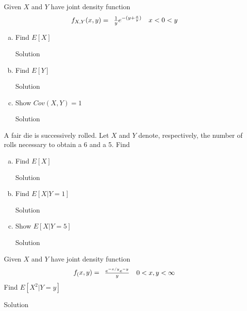 \documentclass{article}
\begin{document}
\begin{spacing}{1.1}
\newpage
\begin{homeworkProblem}
  Given $X$ and $Y$ have joint density function
  \[
    f_{X, Y}( x, y) = \begin{array}{l l}
      \frac{ 1}{ y} e^{-(y + \frac{ x}{ y})} & x < 0 < y\\
    \end{array}
  \]
  \begin{enumerate}[(a)]
    \item Find $E[X]$
      \begin{homeworkSection}{Solution}
      \end{homeworkSection}
    \item Find $E[Y]$
      \begin{homeworkSection}{Solution}
      \end{homeworkSection}
    \item Show $Cov( X, Y) = 1$
      \begin{homeworkSection}{Solution}
      \end{homeworkSection}
  \end{enumerate}
\end{homeworkProblem}

\newpage
\begin{homeworkProblem}
  A fair die is successively rolled. Let $X$ and $Y$ denote, 
  respectively, the number of rolls necessary to obtain a 
  6 and a 5. Find
  \begin{enumerate}[(a)]
    \item Find $E[X]$
      \begin{homeworkSection}{Solution}
      \end{homeworkSection}
    \item Find $E[X|Y = 1]$
      \begin{homeworkSection}{Solution}
      \end{homeworkSection}
    \item Show $E[X|Y = 5]$
      \begin{homeworkSection}{Solution}
      \end{homeworkSection}
  \end{enumerate}
\end{homeworkProblem}

\newpage
\begin{homeworkProblem}
  Given $X$ and $Y$ have joint density function
  \[
    f_( x, y) = \begin{array}{l l}
      \frac{ e^{-x/y} e^{-y}}{ y} & 0 < x,y < \infty\\
    \end{array}
  \]
  Find $E[ X^2|Y = y]$
  \begin{homeworkSection}{Solution}
    

\end{homeworkSection}
\end{homeworkProblem}
\end{spacing}
\end{document}
